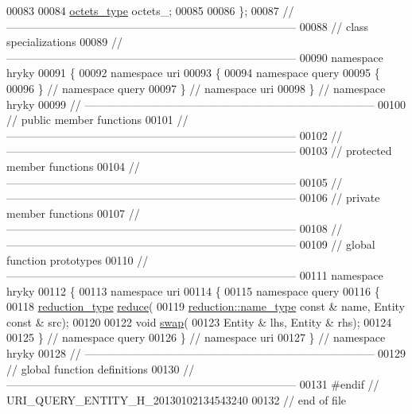 \begin{DoxyCode}
00083 
00084     \hyperlink{classhryky_1_1_vector}{octets_type} octets\_;
00085 
00086 \};
00087 \textcolor{comment}{//
      ------------------------------------------------------------------------------}
00088 \textcolor{comment}{// class specializations}
00089 \textcolor{comment}{//
      ------------------------------------------------------------------------------}
00090 \textcolor{keyword}{namespace }hryky
00091 \{
00092 \textcolor{keyword}{namespace }uri
00093 \{
00094 \textcolor{keyword}{namespace }query
00095 \{
00096 \} \textcolor{comment}{// namespace query}
00097 \} \textcolor{comment}{// namespace uri}
00098 \} \textcolor{comment}{// namespace hryky}
00099 \textcolor{comment}{//
      ------------------------------------------------------------------------------}
00100 \textcolor{comment}{// public member functions}
00101 \textcolor{comment}{//
      ------------------------------------------------------------------------------}
00102 \textcolor{comment}{//
      ------------------------------------------------------------------------------}
00103 \textcolor{comment}{// protected member functions}
00104 \textcolor{comment}{//
      ------------------------------------------------------------------------------}
00105 \textcolor{comment}{//
      ------------------------------------------------------------------------------}
00106 \textcolor{comment}{// private member functions}
00107 \textcolor{comment}{//
      ------------------------------------------------------------------------------}
00108 \textcolor{comment}{//
      ------------------------------------------------------------------------------}
00109 \textcolor{comment}{// global function prototypes}
00110 \textcolor{comment}{//
      ------------------------------------------------------------------------------}
00111 \textcolor{keyword}{namespace }hryky
00112 \{
00113 \textcolor{keyword}{namespace }uri
00114 \{
00115 \textcolor{keyword}{namespace }query
00116 \{
00118     \hyperlink{namespacehryky_a343a9a4c36a586be5c2693156200eadc}{reduction_type} \hyperlink{namespacehryky_1_1uri_ab4530b241565d82fb0768bb29031858f}{reduce}(
00119         \hyperlink{namespacehryky_1_1reduction_ac686c30a4c8d196bbd0f05629a6b921f}{reduction::name_type} \textcolor{keyword}{const} & name, Entity \textcolor{keyword}{const} & src);
00120 
00122     \textcolor{keywordtype}{void} \hyperlink{namespacehryky_1_1uri_a385681623309ce37d502b7efea1bf924}{swap}(
00123         Entity & lhs, Entity & rhs);
00124 
00125 \} \textcolor{comment}{// namespace query}
00126 \} \textcolor{comment}{// namespace uri}
00127 \} \textcolor{comment}{// namespace hryky}
00128 \textcolor{comment}{//
      ------------------------------------------------------------------------------}
00129 \textcolor{comment}{// global function definitions}
00130 \textcolor{comment}{//
      ------------------------------------------------------------------------------}
00131 \textcolor{preprocessor}{#endif // URI\_QUERY\_ENTITY\_H\_20130102134543240}
00132 \textcolor{preprocessor}{}\textcolor{comment}{// end of file}
\end{DoxyCode}
